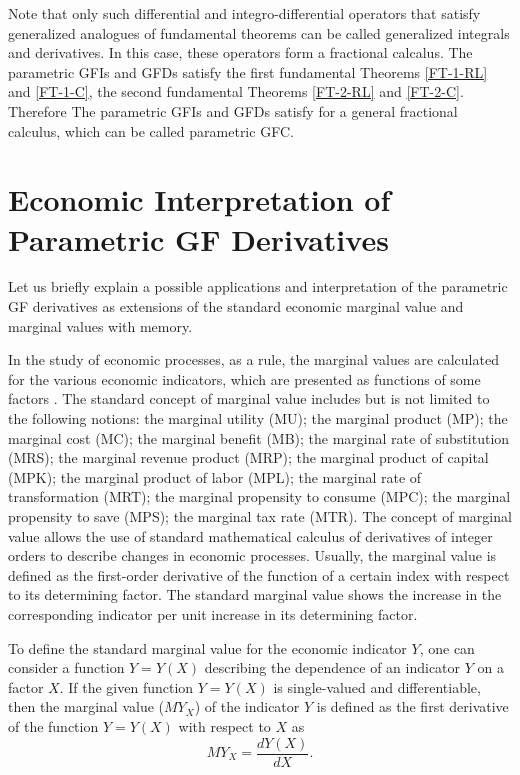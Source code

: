 \documentclass[12pt]{article}
\begin{document}
Note that only such differential and integro-differential operators that satisfy generalized analogues of fundamental theorems can be called generalized integrals and derivatives.
In this case, these operators form a fractional calcalus. 
The parametric GFIs and GFDs satisfy 
the first fundamental Theorems \ref{FT-1-RL} and \ref{FT-1-C},
the second fundamental Theorems
\ref{FT-2-RL} and \ref{FT-2-C}.
Therefore The parametric GFIs and GFDs satisfy 
for a general fractional calculus, 
which can be called parametric GFC. 




\section{Economic Interpretation of Parametric GF Derivatives}

Let us briefly explain a possible applications and interpretation of the parametric GF derivatives as extensions of the standard economic marginal value and marginal values with memory.

In the study of economic processes, as a rule, the marginal values are calculated for the various economic indicators, which are presented as functions of some factors 
\cite{Varian,Varian2010,Gossen-G,Gossen,BOOK-DG-2021}. 
The standard concept of marginal value includes but is not limited to the following notions: 
the marginal utility (MU); 
the marginal product (MP); 
the marginal cost (MC); 
the marginal benefit (MB);
the marginal rate of substitution (MRS);
the marginal revenue product (MRP); 
the marginal product of capital (MPK); 
the marginal product of labor (MPL); 
the marginal rate of transformation (MRT); 
the marginal propensity to consume (MPC); 
the marginal propensity to save (MPS); 
the marginal tax rate (MTR). 
The concept of marginal value allows the use of standard mathematical calculus of derivatives of integer orders to describe changes in economic processes. Usually, the marginal value is defined as the first-order derivative of the function of a certain index with respect to its determining factor. The standard marginal value shows the increase in the corresponding indicator per unit increase in its determining factor. 

To define the standard marginal value for the economic indicator $Y$, one can consider a function $Y=Y(X)$ 
describing the dependence of an indicator $Y$ on a factor
$X$.
If the given function $Y=Y(X)$ is single-valued and differentiable, 
then the marginal value (${MY}_X$) of the indicator $Y$ is defined as the first derivative of the function $Y=Y(X)$ 
with respect to $X$ as
\begin{equation} \label{EQ12-2} 
{MY}_X = \frac{dY(X)}{dX} . 
\end{equation} 
\end{document}

